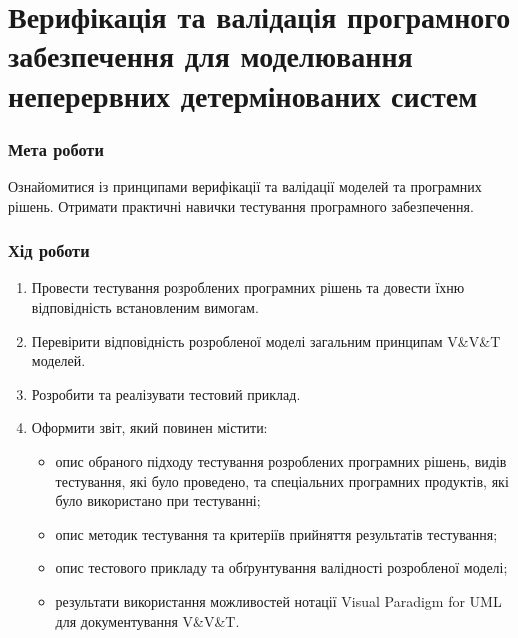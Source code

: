 


\newcommand{\labnumber}{5} %



\graphicspath{{figures/}}


\Ukrainian


\addtocounter{page}{1}

\section*{Верифікація та валідація програмного забезпечення для моделювання неперервних детермінованих систем}
\subsubsection*{Мета роботи}
Ознайомитися із принципами верифікації та валідації моделей та програмних рішень. 
Отримати практичні навички тестування програмного забезпечення.
\subsubsection*{Хід роботи}
\begin{enumerate}
\item Провести тестування розроблених програмних рішень та довести їхню відповідність встановленим вимогам.
\item Перевірити відповідність розробленої моделі загальним принципам V\&V\&T моделей.
\item Розробити та реалізувати тестовий приклад.
\item Оформити звіт, який повинен містити:
\begin{itemize}
\item опис обраного підходу тестування розроблених програмних рішень, видів тестування, які було проведено, та спеціальних програмних продуктів, які було використано при тестуванні;
\item опис методик тестування та критеріїв прийняття результатів тестування;
\item опис тестового прикладу та обґрунтування валідності розробленої моделі;
\item результати використання можливостей нотації Visual Paradigm for UML для документування V\&V\&T.
\end{itemize}
\end{enumerate}


